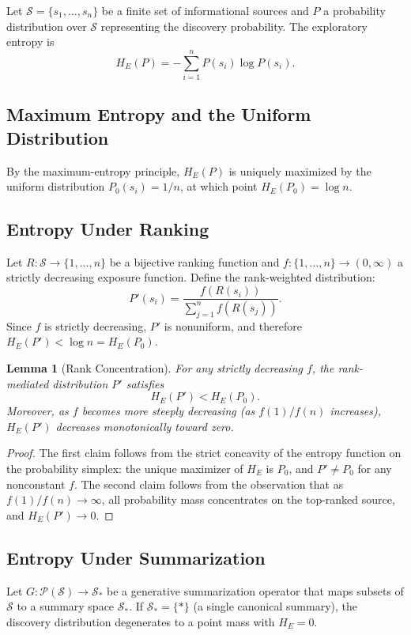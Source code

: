 \documentclass[12pt,a4paper]{article}
\theoremstyle{definition}
\theoremstyle{plain}
\newtheorem{lemma}[definition]{Lemma}
\theoremstyle{remark}
\newcommand{\HE}{H_{E}}
\newcommand{\calS}{\mathcal{S}}
\begin{document}
Let $\calS = \{s_1, \ldots, s_n\}$ be a finite set of informational sources and $P$ a
probability distribution over $\calS$ representing the discovery probability. The exploratory
entropy is
\[
\HE(P) = -\sum_{i=1}^n P(s_i) \log P(s_i).
\]

\subsection{Maximum Entropy and the Uniform Distribution}

By the maximum-entropy principle, $\HE(P)$ is uniquely maximized by the uniform distribution
$P_0(s_i) = 1/n$, at which point $\HE(P_0) = \log n$.

\subsection{Entropy Under Ranking}

Let $R : \calS \to \{1, \ldots, n\}$ be a bijective ranking function and $f : \{1,\ldots,n\}
\to (0, \infty)$ a strictly decreasing exposure function. Define the rank-weighted distribution:
\[
P'(s_i) = \frac{f(R(s_i))}{\sum_{j=1}^n f(R(s_j))}.
\]
Since $f$ is strictly decreasing, $P'$ is nonuniform, and therefore $\HE(P') < \log n =
\HE(P_0)$.

\begin{lemma}[Rank Concentration]
For any strictly decreasing $f$, the rank-mediated distribution $P'$ satisfies
\[
\HE(P') < \HE(P_0).
\]
Moreover, as $f$ becomes more steeply decreasing (as $f(1)/f(n)$ increases),
$\HE(P')$ decreases monotonically toward zero.
\end{lemma}

\begin{proof}
The first claim follows from the strict concavity of the entropy function on the probability
simplex: the unique maximizer of $\HE$ is $P_0$, and $P' \neq P_0$ for any nonconstant $f$.
The second claim follows from the observation that as $f(1)/f(n) \to \infty$, all probability
mass concentrates on the top-ranked source, and $\HE(P') \to 0$.
\end{proof}

\subsection{Entropy Under Summarization}

Let $G : \mathcal{P}(\calS) \to \calS_*$ be a generative summarization operator that maps
subsets of $\calS$ to a summary space $\calS_*$. If $\calS_* = \{*\}$ (a single canonical
summary), the discovery distribution degenerates to a point mass with $\HE = 0$.
\end{document}
